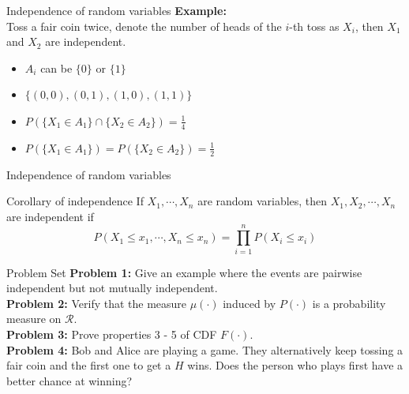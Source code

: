 \documentclass [aspectratio=169]{beamer}
\newcommand{\mc}{\mathcal}
\begin{document}
\begin{frame}{Independence of random variables}
    \textbf{Example:}\\
    Toss a fair coin twice, denote the number of heads of the $i$-th toss as $X_i$, then $X_1$ and $X_2$ are independent.
    \begin{itemize}
        \item $A_i$ can be $\{0\}$ or $\{1\}$
        \item $\{(0, 0), (0, 1), (1, 0), (1, 1)\}$
        \item $P(\{X_1 \in A_1\} \cap \{X_2 \in A_2\}) = \frac{1}{4}$
        \item $P(\{X_1 \in A_1\}) = P(\{X_2 \in A_2\}) = \frac{1}{2}$
    \end{itemize}
    \vspace{0.1in}
\end{frame}

\begin{frame}{Independence of random variables}
 \begin{block}{Corollary of independence}
     If $X_1, \cdots, X_n$ are random variables, then $X_1, X_2, \cdots, X_n$ are independent if 
     $$
        P(X_1 \le x_1, \cdots, X_n \le x_n) = \prod_{i = 1}^n P(X_i \le x_i)
     $$
 \end{block}
 \vspace{0.1in}
\end{frame}



\begin{frame}{Problem Set}
    \textbf{Problem 1:} Give an example where the events are pairwise independent but not mutually independent. \\%
    \vspace{0.1in}
    \textbf{Problem 2:} Verify that the measure $\mu(\cdot)$ induced by $P(\cdot)$ is a probability measure on $\mc{R}$.\\
    \vspace{0.1in}
    \textbf{Problem 3:} Prove properties 3 - 5 of CDF $F(\cdot)$. \\
    \vspace{0.1in}
   \textbf{Problem 4:} Bob and Alice are playing a game. They alternatively keep tossing a fair coin and the first one to get a $H$ wins. Does the person who plays first have a better
chance at winning?

\end{frame}
\end{document}
